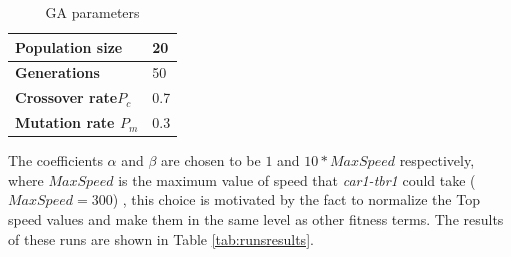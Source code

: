 \documentclass[sigconf]{acmart}
\begin{document}
\begin{table}[!ht]	
		\centering
{\scriptsize
		\caption{GA parameters}
		\label{tab:GA_config}
		\begin{tabular}{|p{3.6cm}|p{3cm}|}
			\hline \textbf{Population size} & 20 \\
			\hline \textbf{Generations} & 50   \\
			\hline \textbf{Crossover rate$\textit{P}_{\textit{c}}$} &  0.7 \\
			\hline \textbf{Mutation rate $\textit{P}_{\textit{m}}$} &  0.3   \\ 		
			\hline          
		\end{tabular}	
}
\end{table}

The coefficients $\alpha$ and $\beta$ are chosen to be $1$  and
$10*MaxSpeed$ respectively, where $MaxSpeed $ is the maximum value of
speed that \textit{car1-tbr1}  could take ($MaxSpeed=300$)
\cite{evo17}, this choice is motivated by the fact to normalize
the Top speed values and make them in the same level as other fitness
terms. 
The results of these runs are shown in Table \ref{tab:runsresults}.
\end{document}
